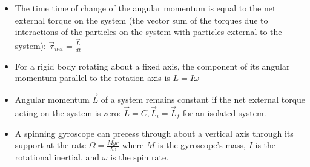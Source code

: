 \documentclass[10pt,letterpaper]{article}
\begin{document}
\begin{itemize}
\item The time time of change of the angular momentum is equal to the net external torque on the system (the vector sum of the torques due to interactions of the particles on the system with particles external to the system): $\vec{\tau}_{net}=\frac{\vec{L}}{dt}$ 
\item For a rigid body rotating about a fixed axis, the component of its angular momentum parallel to the rotation axis is $L=I\omega$
\item Angular momentum $\vec{L}$ of a system remains constant if the net external torque acting on the system is zero: 
$\vec{L}=C, \vec{L}_i=\vec{L}_f$ for an isolated system. 
\item A spinning gyroscope can precess through about a vertical axis through its support at the rate $\Omega=\frac{Mgr}{I\omega} \mbox{ where } M$ is the gyroscope's mass, $I$ is the rotational inertial, and $\omega$ is the spin rate. 



\end{itemize}
\end{document}
